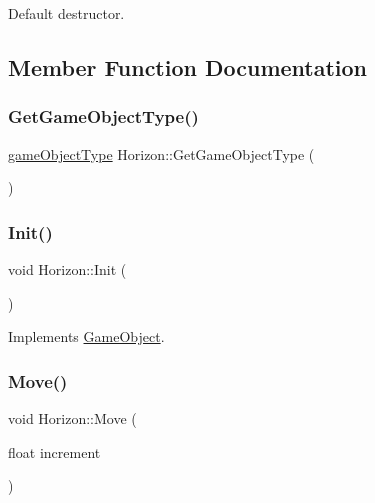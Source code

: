 Default destructor. 



\subsection{Member Function Documentation}
\mbox{\label{class_horizon_abe319d6ba70ce79028ba9175a4bcd4e6}} 
\subsubsection{\texorpdfstring{Get\+Game\+Object\+Type()}{GetGameObjectType()}}
{\footnotesize\ttfamily \mbox{\hyperlink{class_game_object_ad5092169e581fb0772e01026882ea0c8}{game\+Object\+Type}} Horizon\+::\+Get\+Game\+Object\+Type (\begin{DoxyParamCaption}{ }\end{DoxyParamCaption})\hspace{0.3cm}{\ttfamily [inline]}}

\mbox{\label{class_horizon_a80800c898ea4cd015ae865351a6aec4c}} 
\subsubsection{\texorpdfstring{Init()}{Init()}}
{\footnotesize\ttfamily void Horizon\+::\+Init (\begin{DoxyParamCaption}{ }\end{DoxyParamCaption})\hspace{0.3cm}{\ttfamily [virtual]}}



Implements \mbox{\hyperlink{class_game_object_ab3b70fcc4e640ba2081508b1efb35536}{Game\+Object}}.

\mbox{\label{class_horizon_a845596ecfc2953f0d124e5fd0d7cb1d3}} 
\subsubsection{\texorpdfstring{Move()}{Move()}}
{\footnotesize\ttfamily void Horizon\+::\+Move (\begin{DoxyParamCaption}\item[{float}]{increment }\end{DoxyParamCaption})}



